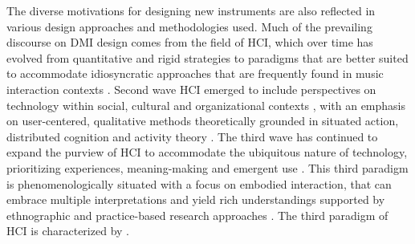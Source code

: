 \documentclass[letterpaper, 12pt]{article}
\begin{document}
The diverse motivations for designing new instruments are also reflected in various design approaches and methodologies used. Much of the prevailing discourse on DMI design comes from the field of HCI, which over time has evolved from quantitative and rigid strategies \citep{Bodker2015} to paradigms that are better suited to accommodate idiosyncratic approaches that are frequently found in music interaction contexts \citep{Wanderley2002}. Second wave HCI emerged to include perspectives on technology within social, cultural and organizational contexts \citep{kaptelinin2003}, with an emphasis on user-centered, qualitative methods theoretically grounded in situated action, distributed cognition and activity theory \citep{Bodker2006}. The third wave has continued to expand the purview of HCI to accommodate the ubiquitous nature of technology, prioritizing experiences, meaning-making and emergent use \citep{Bodker2015}. This third paradigm is phenomenologically situated with a focus on embodied interaction, that can embrace multiple interpretations and yield rich understandings supported by ethnographic and practice-based research approaches \citep{Bodker2015}. The third paradigm of HCI is characterized by \citet{Harrison2007}.


\end{document}

